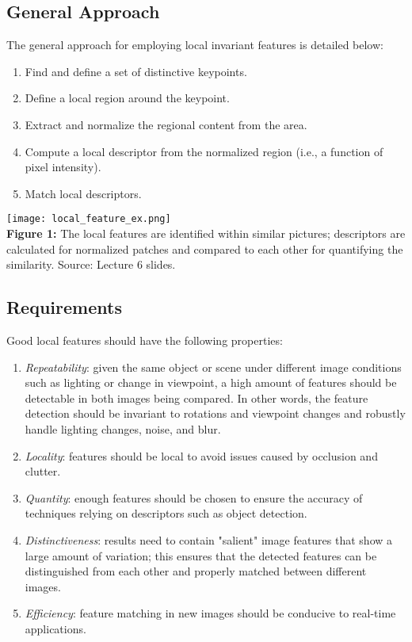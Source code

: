 \documentclass{article}
\begin{document}
\subsection{General Approach}
The general approach for employing local invariant features is detailed below:
\begin{enumerate}
\item Find and define a set of distinctive keypoints.
\item Define a local region around the keypoint.
\item Extract and normalize the regional content from the area.
\item Compute a local descriptor from the normalized region (i.e., a function of pixel intensity).
\item Match local descriptors.
\end{enumerate}
\begin{center}
	\texttt{[image: local\_feature\_ex.png]}\\
  	\textbf{Figure 1:} The local features are identified within similar pictures; descriptors are calculated for normalized patches and compared to each other for quantifying the similarity. Source: Lecture 6 slides. \\
\end{center}
\subsection{Requirements}
Good local features should have the following properties:
\begin{enumerate}
\item \textit{Repeatability}: given the same object or scene under different image conditions such as lighting or change in viewpoint, a high amount of features should be detectable in both images being compared. In other words, the feature detection should be invariant to rotations and viewpoint changes and robustly handle lighting changes, noise, and blur.
\item \textit{Locality}: features should be local to avoid issues caused by occlusion and clutter.
\item \textit{Quantity}: enough features should be chosen to ensure the accuracy of techniques relying on descriptors such as object detection.
\item \textit{Distinctiveness}: results need to contain "salient" image features that show a large amount of variation; this ensures that the detected features can be distinguished from each other and properly matched between different images.
\item \textit{Efficiency}: feature matching in new images should be conducive to real-time applications.
\end{enumerate}
\end{document}

